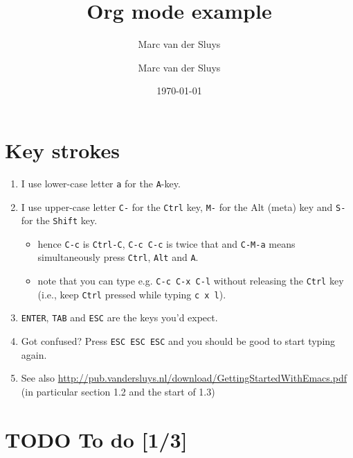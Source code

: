 \documentclass[11pt]{article}
\author{Marc van der Sluys}
\date{\today}
\title{Org mode example}
\author{Marc van der Sluys}
\begin{document}
\maketitle
\tableofcontents


\section{Key strokes}
\label{sec:orge35717d}
\begin{enumerate}
\item I use lower-case letter \texttt{a} for the \texttt{A}-key.
\item I use upper-case letter \texttt{C-} for the \texttt{Ctrl} key, \texttt{M-} for the Alt (meta) key and \texttt{S-} for the \texttt{Shift} key.
\begin{itemize}
\item hence \texttt{C-c} is \texttt{Ctrl-C}, \texttt{C-c C-c} is twice that and \texttt{C-M-a} means simultaneously press \texttt{Ctrl}, \texttt{Alt} and
\texttt{A}.
\item note that you can type e.g. \texttt{C-c C-x C-l} without releasing the \texttt{Ctrl} key (i.e., keep \texttt{Ctrl} pressed
while typing \texttt{c x l}).
\end{itemize}
\item \texttt{ENTER}, \texttt{TAB} and \texttt{ESC} are the keys you'd expect.
\item Got confused?  Press \texttt{ESC ESC ESC} and you should be good to start typing again.
\item See also \url{http://pub.vandersluys.nl/download/GettingStartedWithEmacs.pdf} (in particular section 1.2 and the
start of 1.3)
\end{enumerate}

\section{{\bfseries\sffamily TODO} To do [1/3]}
\label{sec:org35df544}
\end{document}
